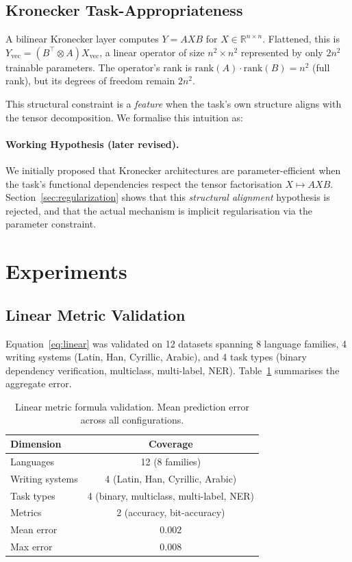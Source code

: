 \documentclass[11pt,a4paper]{article}
\begin{document}
\subsection{Kronecker Task-Appropriateness}
\label{sec:kronecker}

A bilinear Kronecker layer computes $Y = A X B$ for $X \in \mathbb{R}^{n \times n}$.
Flattened, this is $Y_{\text{vec}} = (B^\top \otimes A) X_{\text{vec}}$,
a linear operator of size $n^2 \times n^2$ represented by only $2 n^2$
trainable parameters. The operator's rank is $\text{rank}(A) \cdot \text{rank}(B) = n^2$
(full rank), but its degrees of freedom remain $2 n^2$.

This structural constraint is a \emph{feature} when the task's own structure
aligns with the tensor decomposition. We formalise this intuition as:

\paragraph{Working Hypothesis (later revised).}
We initially proposed that Kronecker architectures are parameter-efficient
when the task's functional dependencies respect the tensor factorisation
$X \mapsto A X B$. Section~\ref{sec:regularization} shows that this
\emph{structural alignment} hypothesis is rejected, and that the actual
mechanism is implicit regularisation via the parameter constraint.


\section{Experiments}
\label{sec:experiments}

\subsection{Linear Metric Validation}
\label{sec:exp-linear}

Equation~\ref{eq:linear} was validated on 12 datasets spanning 8 language
families, 4 writing systems (Latin, Han, Cyrillic, Arabic), and 4 task
types (binary dependency verification, multiclass, multi-label, NER).
Table~\ref{tab:linear} summarises the aggregate error.

\begin{table}[h]
\centering
\caption{Linear metric formula validation. Mean prediction error across
all configurations.}
\label{tab:linear}
\small
\begin{tabular}{lc}
\toprule
Dimension & Coverage \\
\midrule
Languages        & 12 (8 families) \\
Writing systems  & 4 (Latin, Han, Cyrillic, Arabic) \\
Task types       & 4 (binary, multiclass, multi-label, NER) \\
Metrics          & 2 (accuracy, bit-accuracy) \\
\midrule
Mean error       & $0.002$ \\
Max error        & $0.008$ \\
\bottomrule
\end{tabular}
\end{table}
\end{document}
